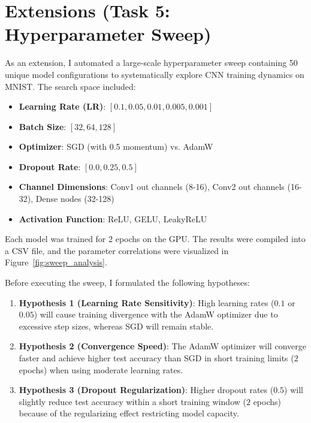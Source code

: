 \documentclass[11pt,letterpaper]{article}
\begin{document}
\section*{Extensions (Task 5: Hyperparameter Sweep)}

As an extension, I automated a large-scale hyperparameter sweep containing 50 unique model configurations to systematically explore CNN training dynamics on MNIST. The search space included:
\begin{itemize}
    \item \textbf{Learning Rate (LR)}: $[0.1, 0.05, 0.01, 0.005, 0.001]$
    \item \textbf{Batch Size}: $[32, 64, 128]$
    \item \textbf{Optimizer}: SGD (with 0.5 momentum) vs. AdamW
    \item \textbf{Dropout Rate}: $[0.0, 0.25, 0.5]$
    \item \textbf{Channel Dimensions}: Conv1 out channels (8-16), Conv2 out channels (16-32), Dense nodes (32-128)
    \item \textbf{Activation Function}: ReLU, GELU, LeakyReLU
\end{itemize}

Each model was trained for 2 epochs on the GPU. The results were compiled into a CSV file, and the parameter correlations were visualized in Figure~\ref{fig:sweep_analysis}.

Before executing the sweep, I formulated the following hypotheses:
\begin{enumerate}
    \item \textbf{Hypothesis 1 (Learning Rate Sensitivity)}: High learning rates ($0.1$ or $0.05$) will cause training divergence with the AdamW optimizer due to excessive step sizes, whereas SGD will remain stable.
    \item \textbf{Hypothesis 2 (Convergence Speed)}: The AdamW optimizer will converge faster and achieve higher test accuracy than SGD in short training limits ($2$ epochs) when using moderate learning rates.
    \item \textbf{Hypothesis 3 (Dropout Regularization)}: Higher dropout rates ($0.5$) will slightly reduce test accuracy within a short training window ($2$ epochs) because of the regularizing effect restricting model capacity.
\end{enumerate}
\end{document}
